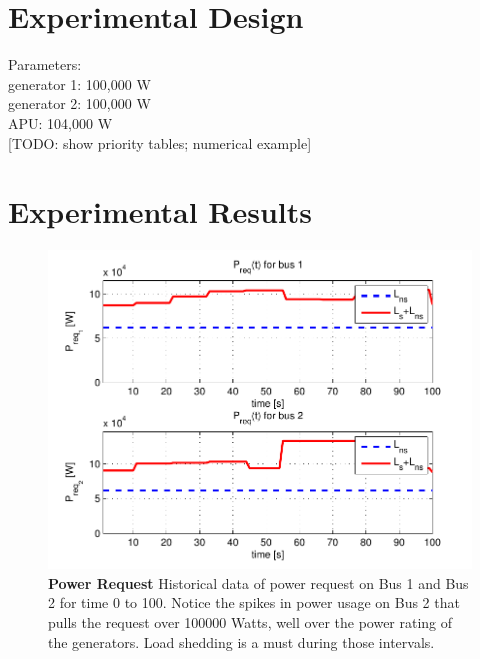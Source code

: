 \documentclass{acm_proc_article-sp}
\begin{document}
\section{Experimental Design}

Parameters: \\
generator 1: 100,000 W \\
generator 2: 100,000 W \\
APU: 104,000 W \\

[TODO: show priority tables; numerical example]

\section{Experimental Results}
\begin{figure}[htb]
  \centering
  \includegraphics[width=\columnwidth]{figures/preqnofail}
  \caption{\textbf{Power Request}
  Historical data of power request on Bus 1 and Bus 2 for time 0
  to 100. Notice the spikes in power usage on Bus 2 that pulls the
  request over 100000 Watts, well over the power rating of the generators.
  Load shedding is a must during those intervals.}
  \label{fig:preqnofail}
\end{figure}
\end{document}
